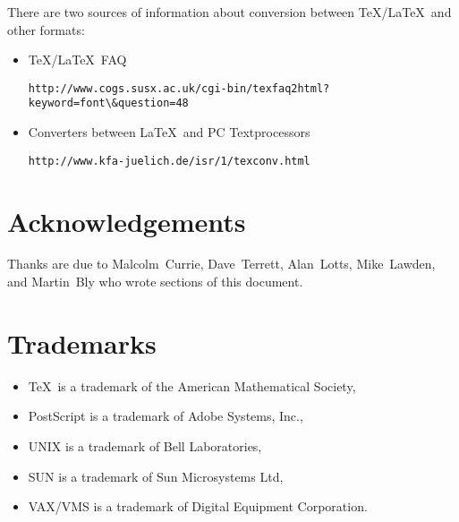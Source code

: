 \documentclass[11pt,twoside]{article}
\newcommand{\htmladdnormallink}[2]{#1}
\newenvironment{latexonly}{}{}
\newcommand{\xlabel}[1]{}
\begin{document}
There are two sources of information about conversion between \TeX/\LaTeX\ and 
other formats:

\begin{itemize}
  \item \htmladdnormallink{\TeX/\LaTeX\ FAQ}
    {http://www.cogs.susx.ac.uk/cgi-bin/texfaq2html?keyword=font&question=48}
    \begin{latexonly}
      \begin{verbatim}
http://www.cogs.susx.ac.uk/cgi-bin/texfaq2html?keyword=font\&question=48
      \end{verbatim}
    \end{latexonly}
  \item \htmladdnormallink{Converters between \LaTeX\ and PC Textprocessors}
    {http://www.kfa-juelich.de/isr/1/texconv.html}
    \begin{latexonly}
      \begin{verbatim}
http://www.kfa-juelich.de/isr/1/texconv.html
      \end{verbatim}
    \end{latexonly}
\end{itemize}


\section{\xlabel{acknowledgements}\label{acknowledgements}Acknowledgements}

Thanks are due to Malcolm~Currie, Dave~Terrett, Alan~Lotts,
Mike~Lawden, and Martin~Bly who wrote sections of this document. 

\section{\xlabel{trademarks}\label{trademarks}Trademarks}
\begin{itemize}
\item \TeX\ is a trademark of the American Mathematical Society,
\item PostScript is a trademark of Adobe Systems, Inc.,
\item UNIX is a trademark of Bell Laboratories,
\item SUN is a trademark of Sun Microsystems Ltd,
\item VAX/VMS is a trademark of Digital Equipment Corporation.
\end{itemize}

\newpage
{}~

\typeout{}
\typeout{}
\typeout{}
\typeout{}
\end{document}
